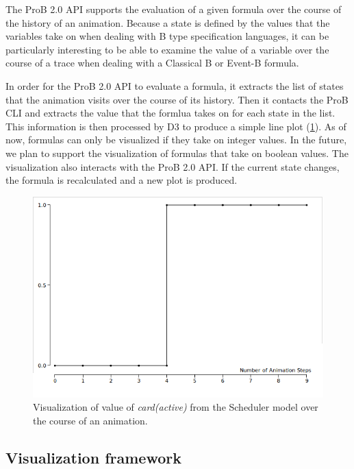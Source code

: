 The ProB 2.0 API supports the evaluation of a given formula over the course of the history of an animation.
Because a state is defined by the values that the variables take on when dealing with B type specification languages, it can be particularly interesting to be able to examine the value of a variable over the course of a trace when dealing with a Classical B or Event-B formula. 

In order for the ProB 2.0 API to evaluate a formula, it extracts the list of states that the animation visits over the course of its history. Then it contacts the ProB CLI and extracts the value that the formlua takes on for each state in the list. This information is then processed by D3 to produce a simple line plot (\ref{timeVsValue}). As of now, formulas can only be visualized if they take on integer values. In the future, we plan to support the visualization of formulas that take on boolean values. The visualization also interacts with the ProB 2.0 API. If the current state changes, the formula is recalculated and a new plot is produced.

\begin{figure}[h!]
\centering
\includegraphics[width=15cm]{bilder/timeVsValue.png}
\caption{Visualization of value of \emph{card(active)} from the Scheduler model over the course of an animation.}
\label{timeVsValue}
\end{figure}

\subsection{Visualization framework}

